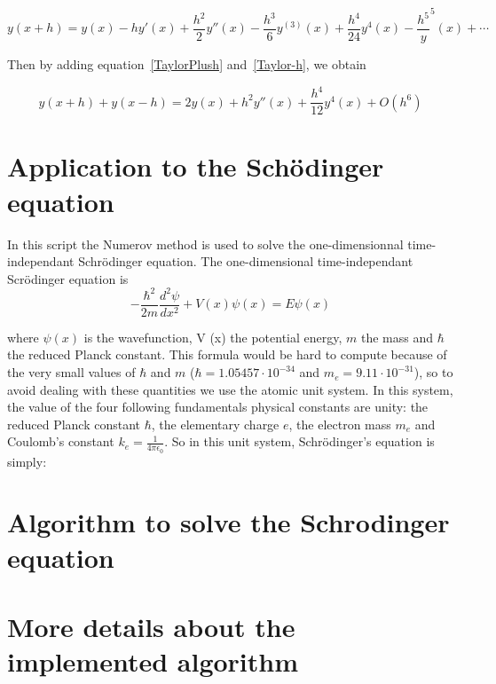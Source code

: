 \documentclass[12pt]{article}
\begin{document}
\begin{equation}
y(x+h) = y(x) - hy'(x) + \frac{h^2}{2}y''(x) - \frac{h^3}{6}y^{(3)}(x) + \frac{h^4}{24}y^{4}(x) - \frac{h^5}y^{5}(x) + \cdots
\label{Taylor-h}
\end{equation}

Then by adding equation~\ref{TaylorPlush} and~\ref{Taylor-h}, we obtain 

\begin{equation}
y(x+h) + y(x-h) = 2y(x) + h^2y''(x) + \frac{h^4}{12}y^{4}(x) + O(h^6)
\label{AddingEq}
\end{equation}



\section{Application to the Schödinger equation}

In this script the Numerov method is used to solve the one-dimensionnal time-independant Schrödinger equation. 
The one-dimensional time-independant Scrödinger equation is 
\begin{equation}
-\frac{\hbar^2}{2m}\frac{d^2\psi}{dx^2} + V(x)\psi(x) = E\psi(x)
\label{SchrodEq}
\end{equation}

where $\psi(x)$ is the wavefunction, V (x) the potential energy, $m$ the mass and $\hbar$ the reduced Planck constant. This formula would be hard to compute because of the very small values
of $\hbar$ and $m$ ($\hbar = 1.05457 \cdot 10^{-34}$ and $m_e = 9.11\cdot10^{-31}$), so to avoid dealing with these quantities we use the atomic unit system. In this system, the value of the four
following fundamentals physical constants are unity:  the reduced Planck constant $\hbar$, the elementary charge $e$, the electron mass $m_e$ and Coulomb's constant $k_e = \frac{1}{4\pi\epsilon_0}$.
So in this unit system, Schrödinger's equation is simply:



\section{Algorithm to solve the Schrodinger equation}



\section{More details about the implemented algorithm}
\end{document}
